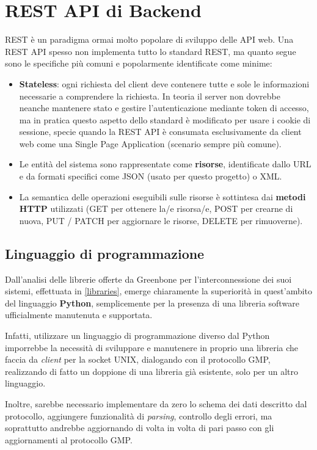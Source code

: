 \section{REST API di Backend}
REST è un paradigma ormai molto popolare di sviluppo delle API web. Una REST API spesso non implementa tutto lo standard REST, ma quanto segue sono le specifiche più comuni e popolarmente identificate come minime:
\begin{itemize}
    \item \textbf{Stateless}: ogni richiesta del client deve contenere tutte e sole le informazioni necessarie a comprendere la richiesta. In teoria il server non dovrebbe neanche mantenere stato e gestire l'autenticazione mediante token di accesso, ma in pratica questo aspetto dello standard è modificato per usare i cookie di sessione, specie quando la REST API è consumata esclusivamente da client web come una Single Page Application (scenario sempre più comune).
    \item Le entità del sistema sono rappresentate come \textbf{risorse}, identificate dallo URL e da formati specifici come JSON (usato per questo progetto) o XML.
    \item La semantica delle operazioni eseguibili sulle risorse è sottintesa dai \textbf{metodi HTTP} utilizzati (GET per ottenere la/e risorsa/e, POST per crearne di nuova, PUT / PATCH per aggiornare le risorse, DELETE per rimuoverne).
\end{itemize}

\subsection{Linguaggio di programmazione}
Dall'analisi delle librerie offerte da Greenbone per l'interconnessione dei suoi sistemi, effettuata in \ref{libraries}, emerge chiaramente la superiorità in quest'ambito del linguaggio \textbf{Python}, semplicemente per la presenza di una libreria software ufficialmente manutenuta e supportata.

Infatti, utilizzare un linguaggio di programmazione diverso dal Python imporrebbe la necessità di sviluppare e manutenere in proprio una libreria che faccia da \emph{client} per la socket UNIX, dialogando con il protocollo GMP, realizzando di fatto un doppione di una libreria già esistente, solo per un altro linguaggio.

Inoltre, sarebbe necessario implementare da zero lo schema dei dati descritto dal protocollo, aggiungere funzionalità di \emph{parsing}, controllo degli errori, ma soprattutto andrebbe aggiornando di volta in volta di pari passo con gli aggiornamenti al protocollo GMP.

